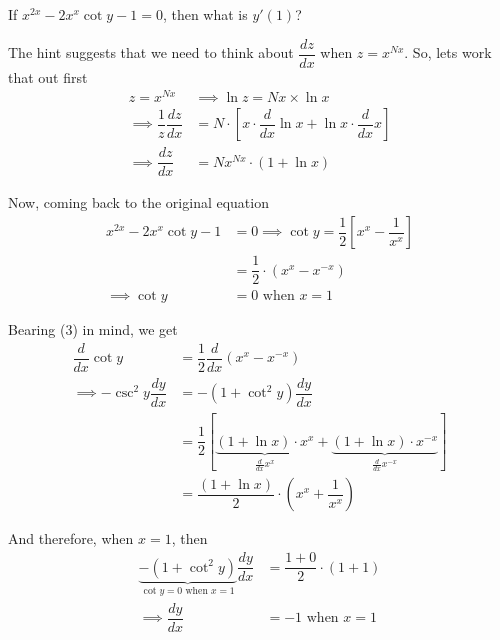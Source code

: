 

\question[3] If $x^{2x}-2x^{x}\cot y - 1 = 0$, then what is $y'(1)$?

\ifprintanswers
\fi 

\begin{solution}[\halfpage]
  The hint suggests that we need to think about $\dfrac{dz}{dx}$ when $z=x^{Nx}$. So, lets work that out first 
  \begin{align}
    z = x^{Nx} &\implies \ln z = Nx\times\ln x \\
    \implies \dfrac{1}{z}\dfrac{dz}{dx} &= N\cdot\left[ x\cdot\dfrac{d}{dx}\ln x + \ln x\cdot\dfrac{d}{dx}x\right] \\
    \implies \dfrac{dz}{dx} &= Nx^{Nx}\cdot(1+\ln x)
  \end{align}
  
  Now, coming back to the original equation
	\begin{align}
	  x^{2x}-2x^{x}\cot y - 1 &= 0 \implies
	  \cot y = \dfrac{1}{2}\left[x^{x}-\dfrac{1}{x^{x}} \right] \\
	  &= \dfrac{1}{2}\cdot(x^x-x^{-x}) \\
	  \implies\cot y &= 0 \text{ when } x = 1
	\end{align}
	
	Bearing (3) in mind, we get 
	\begin{align}
	  \dfrac{d}{dx}\cot y &= \dfrac{1}{2}\dfrac{d}{dx}(x^x-x^{-x}) \\
	  \implies -\csc^2 y\dfrac{dy}{dx} &= -(1+\cot^2 y)\dfrac{dy}{dx} \nonumber\\ 
	  &= \dfrac{1}{2}\left[ \underbrace{(1+\ln x)\cdot x^x}_{\frac{d}{dx}x^x} + 
	  \underbrace{(1+\ln x)\cdot x^{-x}}_{\frac{d}{dx}x^{-x}}\right] \\
	  &= \dfrac{(1+\ln x)}{2}\cdot\left(x^x + \dfrac{1}{x^x}\right)
	\end{align}
	
	And therefore, when $x=1$, then 
	\begin{align}
	  \underbrace{-(1+\cot^2 y)}_{\cot y = 0\text{ when } x=1}\dfrac{dy}{dx} &= 
	  \dfrac{1+0}{2}\cdot (1+1) \\
	  \implies \dfrac{dy}{dx} &= -1 \text{ when } x=1
	\end{align}	
\end{solution}
